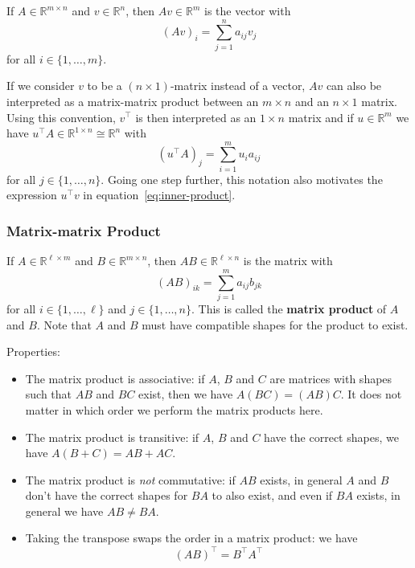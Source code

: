 \documentclass[
  a4paper,
]{article}
\theoremstyle{definition}
\theoremstyle{definition}
\theoremstyle{definition}
\theoremstyle{definition}
\theoremstyle{remark}
\begin{document}
If \(A \in \mathbb{R}^{m \times n}\) and \(v \in \mathbb{R}^n\), then
\(Av \in \mathbb{R}^m\) is the vector with
\begin{equation*}
  (Av)_i
  = \sum_{j=1}^n a_{ij} v_j
\end{equation*}
for all \(i \in \{1, \ldots, m\}\).

If we consider \(v\) to be a \((n\times 1)\)-matrix instead of a vector,
\(Av\) can also be interpreted as a matrix-matrix product between an \(m \times n\) and an \(n\times 1\) matrix. Using this convention, \(v^\top\)
is then interpreted as an \(1 \times n\) matrix and if \(u\in\mathbb{R}^m\) we
have \(u^\top A \in \mathbb{R}^{1 \times n} \cong \mathbb{R}^n\) with
\begin{equation*}
  (u^\top A)_j
  = \sum_{i=1}^m u_i a_{ij}
\end{equation*}
for all \(j \in \{1, \ldots, n\}\). Going one step further, this
notation also motivates the expression \(u^\top v\) in
equation~\eqref{eq:inner-product}.

\hypertarget{matrix-matrix-product}{%
\subsubsection{Matrix-matrix Product}\label{matrix-matrix-product}}

If \(A \in \mathbb{R}^{\ell \times m}\) and \(B \in \mathbb{R}^{m\times n}\), then
\(AB \in \mathbb{R}^{\ell \times n}\) is the matrix with
\begin{equation*}
  (AB)_{ik}
  = \sum_{j=1}^m a_{ij} b_{jk}
\end{equation*}
for all \(i \in \{1, \ldots, \ell\}\) and \(j \in \{1, \ldots, n\}\).
This is called the \textbf{matrix product} of \(A\) and \(B\). Note
that \(A\) and \(B\) must have compatible shapes for the product to exist.

Properties:

\begin{itemize}
\item
  The matrix product is associative: if \(A\), \(B\) and \(C\) are matrices
  with shapes such that \(AB\) and \(BC\) exist, then we have \(A(BC) = (AB)C\).
  It does not matter in which order we perform the matrix products here.
\item
  The matrix product is transitive: if \(A\), \(B\) and \(C\) have the
  correct shapes, we have \(A(B+C) = AB + AC\).
\item
  The matrix product is \emph{not} commutative: if \(AB\) exists, in general
  \(A\) and \(B\) don't have the correct shapes for \(BA\) to also exist,
  and even if \(BA\) exists, in general we have \(AB \neq BA\).
\item
  Taking the transpose swaps the order in a matrix product:
  we have
  \begin{equation}
    (AB)^\top = B^\top A^\top  \label{eq:AB-trans}
  \end{equation}
\end{itemize}
\end{document}

